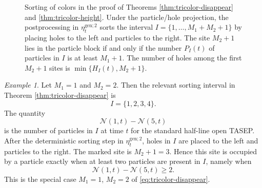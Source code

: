 \documentclass[12pt,a4paper]{amsart}
\theoremstyle{remark}
\newtheorem{example}[theorem]{Example}
\numberwithin{equation}{section} \numberwithin{theorem}{section}
\begin{document}
\begin{figure}[t]
\centering
{}
\caption{Sorting of colors in the proof of Theorems \ref{thm:tricolor-disappear} and \ref{thm:tricolor-height}. 
Under the particle/hole projection, the postprocessing in $\eta_t^{\mathrm{gen};2}$ sorts the interval $I=\{1,\ldots,M_1+M_2+1\}$ by placing holes to the left and particles to the right. 
The site $M_2+1$ lies in the particle block if and only if the number $P_I(t)$ of particles in $I$ is at least $M_1+1$. 
The number of holes among the first $M_2+1$ sites is $\min\{H_I(t),M_2+1\}$.}
\label{fig:one-shock-sorting}
\end{figure}

\begin{example}
Let $M_1=1$ and $M_2=2$. 
Then the relevant sorting interval in Theorem \ref{thm:tricolor-disappear} is
\[
I=\{1,2,3,4\}.
\]
The quantity
\[
\mathcal N(1,t)-\mathcal N(5,t)
\]
is the number of particles in $I$ at time $t$ for the standard half-line open TASEP. 
After the deterministic sorting step in $\eta_t^{\mathrm{gen};2}$, holes in $I$ are placed to the left and particles to the right. 
The marked site is $M_2+1=3$. 
Hence this site is occupied by a particle exactly when at least two particles are present in $I$, namely when
\[
\mathcal N(1,t)-\mathcal N(5,t)\geq 2.
\]
This is the special case $M_1=1$, $M_2=2$ of \eqref{eq:tricolor-disappear}.
\end{example}
\end{document}
